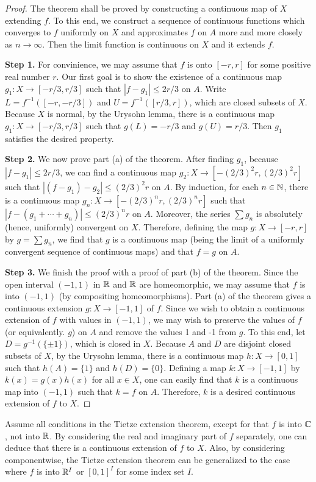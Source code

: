 \begin{proof}
    The theorem shall be proved by constructing a continuous map of $X$ extending $f$.
    To this end, we construct a sequence of continuous functions which converges to $f$ uniformly on $X$ and approximates $f$ on $A$ more and more closely as $n\rightarrow\infty$.
    Then the limit function is continuous on $X$ and it extends $f$.

    \textbf{Step 1.}
    For convinience, we may assume that $f$ is onto $[-r, r]$ for some positive real number $r$.
    Our first goal is to show the existence of a continuous map $g_1: X\rightarrow[-r/3, r/3]$ such that $|f-g_1|\leq 2r/3$ on $A$.
    Write $L=f^{-1}([-r, -r/3])$ and $U=f^{-1}([r/3, r])$, which are closed subsets of $X$.
    Because $X$ is normal, by the Urysohn lemma, there is a continuous map $g_1: X\rightarrow [-r/3, r/3]$ such that $g(L)=-r/3$ and $g(U)=r/3$.
    Then $g_1$ satisfies the desired property.

    \textbf{Step 2.}
    We now prove part (a) of the theorem.
    After finding $g_1$, because $|f-g_1|\leq 2r/3$, we can find a continuous map $g_2: X\rightarrow [-(2/3)^2 r, (2/3)^2 r]$ such that $|(f-g_1)-g_2|\leq (2/3)^2 r$ on $A$.
    By induction, for each $n\in{\mathbb{N}}$, there is a continuous map $g_n: X\rightarrow [-(2/3)^n r, (2/3)^n r]$ such that $|f-(g_1+\cdots+g_n)|\leq(2/3)^n r$ on $A$.
    Moreover, the series $\sum g_n$ is absolutely (hence, uniformly) convergent on $X$.
    Therefore, defining the map $g: X\rightarrow [-r, r]$ by $g=\sum g_n$, we find that $g$ is a continuous map (being the limit of a uniformly convergent sequence of continuous maps) and that $f=g$ on $A$.

    \textbf{Step 3.}
    We finish the proof with a proof of part (b) of the theorem.
    Since the open interval $(-1, 1)$ in ${\mathbb{R}}$ and ${\mathbb{R}}$ are homeomorphic, we may assume that $f$ is into $(-1, 1)$ (by compositing homeomorphisms).
    Part (a) of the theorem gives a continuous extension $g: X\rightarrow [-1, 1]$ of $f$.
    Since we wish to obtain a continuous extension of $f$ with values in $(-1, 1)$, we may wish to preserve the values of $f$ (or equivalently. $g$) on $A$ and remove the values 1 and -1 from $g$.
    To this end, let $D=g^{-1}(\{\pm 1\})$, which is closed in $X$.
    Because $A$ and $D$ are disjoint closed subsets of $X$, by the Urysohn lemma, there is a continuous map $h: X\rightarrow [0, 1]$ such that $h(A)=\{1\}$ and $h(D)=\{0\}$.
    Defining a map $k: X\rightarrow [-1, 1]$ by $k(x)=g(x)h(x)$ for all $x\in X$, one can easily find that $k$ is a continuous map into $(-1, 1)$ such that $k=f$ on $A$.
    Therefore, $k$ is a desired continuous extension of $f$ to $X$.
\end{proof}

\begin{rmk}
    Assume all conditions in the Tietze extension theorem, except for that $f$ is into ${\mathbb{C}}$, not into ${\mathbb{R}}$.
    By considering the real and imaginary part of $f$ separately, one can deduce that there is a continuous extension of $f$ to $X$.
    Also, by considering componentwise, the Tietze extension theorem can be generalized to the case where $f$ is into ${\mathbb{R}}^I$ or $[0, 1]^I$ for some index set $I$.
\end{rmk}
